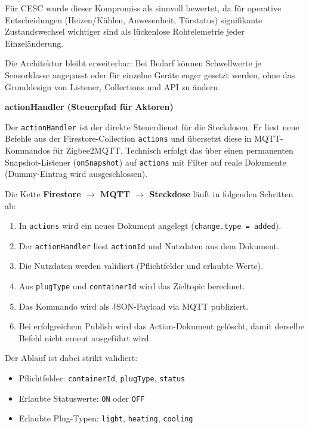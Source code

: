 Für CESC wurde dieser Kompromiss als sinnvoll bewertet, da für operative Entscheidungen (Heizen/Kühlen, Anwesenheit, Türstatus) signifikante Zustandswechsel wichtiger sind als lückenlose Rohtelemetrie jeder Einzeländerung.

Die Architektur bleibt erweiterbar: Bei Bedarf können Schwellwerte je Sensorklasse angepasst oder für einzelne Geräte enger gesetzt werden, ohne das Grunddesign von Listener, Collections und API zu ändern.

\textbf{actionHandler (Steuerpfad für Aktoren)}


Der \texttt{actionHandler} ist der direkte Steuerdienst für die Steckdosen. Er liest neue Befehle aus der Firestore-Collection \texttt{actions} und übersetzt diese in MQTT-Kommandos für Zigbee2MQTT. Technisch erfolgt das über einen permanenten Snapshot-Listener (\texttt{onSnapshot}) auf \texttt{actions} mit Filter auf reale Dokumente (Dummy-Eintrag wird ausgeschlossen).

Die Kette \textbf{Firestore $\rightarrow$ MQTT $\rightarrow$ Steckdose} läuft in folgenden Schritten ab:

\begin{enumerate}
    \item In \texttt{actions} wird ein neues Dokument angelegt (\texttt{change.type = added}).
    \item Der \texttt{actionHandler} liest \texttt{actionId} und Nutzdaten aus dem Dokument.
    \item Die Nutzdaten werden validiert (Pflichtfelder und erlaubte Werte).
    \item Aus \texttt{plugType} und \texttt{containerId} wird das Zieltopic berechnet.
    \item Das Kommando wird als JSON-Payload via MQTT publiziert.
    \item Bei erfolgreichem Publish wird das Action-Dokument gelöscht, damit derselbe Befehl nicht erneut ausgeführt wird.
\end{enumerate}

Der Ablauf ist dabei strikt validiert:

\begin{itemize}
    \item Pflichtfelder: \texttt{containerId}, \texttt{plugType}, \texttt{status}
    \item Erlaubte Statuswerte: \texttt{ON} oder \texttt{OFF}
    \item Erlaubte Plug-Typen: \texttt{light}, \texttt{heating}, \texttt{cooling}
\end{itemize}

